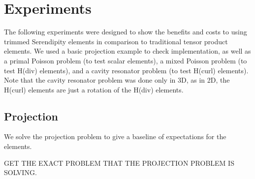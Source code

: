 \documentclass[manuscript,screen]{acmart}
\begin{document}
  \section{Experiments}
    
   The following experiments were designed to show the benefits and costs to using trimmed Serendipity elements in comparison to traditional tensor product elements.  We used a basic projection example to check implementation, as well as a primal Poisson problem (to test scalar elements), a mixed Poisson problem (to test H(div) elements), and a cavity resonator problem (to test H(curl) elements).  Note that the cavity resonator problem was done only in 3D, as in 2D, the H(curl) elements are just a rotation of the H(div) elements. 

\newpage
  \subsection{Projection}
  
  We solve the projection problem to give a baseline of expectations for the elements.  
  
  GET THE EXACT PROBLEM THAT THE PROJECTION PROBLEM IS SOLVING.
\end{document}

